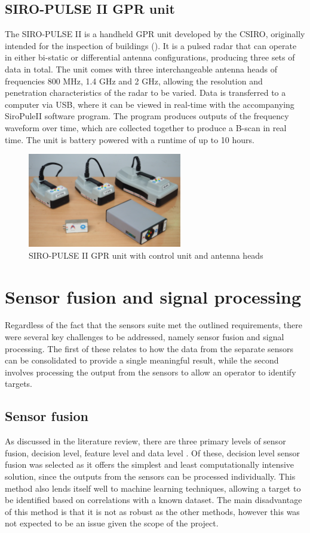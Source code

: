 \documentclass[main.tex]{subfiles}
\begin{document}
\subsection{SIRO-PULSE II GPR unit}
The SIRO-PULSE II is a handheld GPR unit developed by the CSIRO, originally intended for the inspection of buildings (). It is a pulsed radar that can operate in either bi-static or differential antenna configurations, producing three sets of data in total. The unit comes with three interchangeable antenna heads of frequencies 800 MHz, 1.4 GHz and 2 GHz, allowing the resolution and penetration characteristics of the radar to be varied. Data is transferred to a computer via USB, where it can be viewed in real-time with the accompanying SiroPuleII software program. The program produces outputs of the frequency waveform over time, which are collected together to produce a B-scan in real time. The unit is battery powered with a runtime of up to 10 hours. 

\begin{figure}[ht]
\includegraphics[width=0.6\textwidth]{3-ConceptDesign/SiroPulse.JPG}
\centering
\caption{SIRO-PULSE II GPR unit with control unit and antenna heads} 
\end{figure}

\section{Sensor fusion and signal processing}
Regardless of the fact that the sensors suite met the outlined requirements, there were several key challenges to be addressed, namely sensor fusion and signal processing. The first of these relates to how the data from the separate sensors can be consolidated to provide a single meaningful result, while the second involves processing the output from the sensors to allow an operator to identify targets. 

\subsection{Sensor fusion}
As discussed in the literature review, there are three primary levels of sensor fusion, decision level, feature level and data level \parencite{Yarovoy2009}. Of these, decision level sensor fusion was selected as it offers the simplest and least computationally intensive solution, since the outputs from the sensors can be processed individually. This method also lends itself well to machine learning techniques, allowing a target to be identified based on correlations with a known dataset. The main disadvantage of this method is that it is not as robust as the other methods, however this was not expected to be an issue given the scope of the project. 
\end{document}

